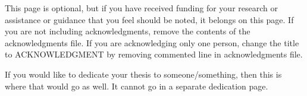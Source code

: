 
\begin{acknowledgments}

    This page is optional, but if you have received funding for your research or assistance or guidance that you feel should be noted, it belongs on this page. If you are not including acknowledgments, remove the contents of the acknowledgments file. If you are acknowledging only one person, change the title to ACKNOWLEDGMENT by removing commented line in acknowledgments file.

    If you would like to dedicate your thesis to someone/something, then this is where that would go as well. It cannot go in a separate dedication page.  %

\end{acknowledgments}
